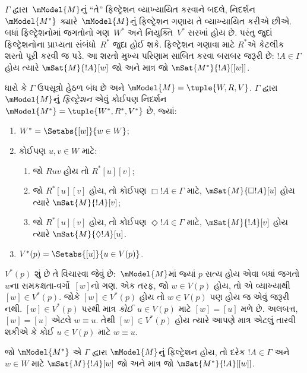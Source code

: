 $\Gamma$ દ્વારા~$\mModel{M}$નું ``તે'' ફિલ્ટ્રેશન વ્યાખ્યાયિત
કરવાને બદલે, નિદર્શન~$\mModel{M^*}$ ક્યારે~$\mModel{M}$નું
ફિલ્ટ્રેશન ગણાય તે વ્યાખ્યાયિત કરીએ છીએ. બધાં ફિલ્ટ્રેશનોમાં
જગતોનો ગણ~$W^*$ અને નિયુક્તિ~$V^*$ સરખાં હોય છે. પરંતુ જુદાં
ફિલ્ટ્રેશનોના પ્રાપ્યતા સંબંધો~$R^*$ જુદા હોઈ શકે. ફિલ્ટ્રેશન
ગણાવા માટે $R^*$એ કેટલીક શરતો પૂરી કરવી જ પડે. આ શરતો મુખ્ય
પરિણામ સાબિત કરવા બરાબર જરૂરી છે: $!A \in \Gamma$ હોય ત્યારે
$\mSat{M}{!A}[w]$ જો અને માત્ર જો
$\mSat{M^*}{!A}[{[w]}]$.

\begin{defn}
  ધારો કે $\Gamma$ ઉપસૂત્રો હેઠળ બંધ છે અને
  $\mModel{M} = \tuple{W, R, V}$. $\Gamma$ દ્વારા
  $\mModel{M}$નું \emph{ફિલ્ટ્રેશન} એવું કોઈપણ નિદર્શન
  $\mModel{M^*} = \tuple{W^*,R^*,V^*}$ છે, જ્યાં:
  \begin{enumerate}
  \item $W^* = \Setabs{[w]}{w \in W}$;
  \item {}%
    કોઈપણ $u,v \in W$ માટે:
    \begin{enumerate}
    \item {}%
      જો $Ruv$ હોય તો $R^*[u][v]$;
    \item {}%
      જો $R^*[u][v]$ હોય, તો કોઈપણ $\Box !A \in \Gamma$ માટે,
      $\mSat{M}{\Box!A}[u]$ હોય ત્યારે $\mSat{M}{!A}[v]$;
    \item {}%
      જો $R^*[u][v]$ હોય, તો કોઈપણ $\Diamond !A \in \Gamma$
      માટે, $\mSat{M}{!A}[v]$ હોય ત્યારે
      $\mSat{M}{\Diamond!A}[u]$.
    \end{enumerate}
  \item $V^*(p) = \Setabs{[u]}{u \in V(p)}$.
  \end{enumerate}
\end{defn}

$V^*(p)$ શું છે તે વિચારવા જેવું છે:~$\mModel{M}$માં જ્યાં $p$
સત્ય હોય એવા બધાં જગતો~$w$ના સમકક્ષતા-વર્ગો~$[w]$નો ગણ.
એક તરફ, જો $w \in V(p)$ હોય, તો એ વ્યાખ્યાથી $[w] \in
V^*(p)$. જોકે $[w] \in V^*(p)$ હોય તો $w \in V(p)$ પણ હોય જ એવું
જરૂરી નથી. $[w] \in V^*(p)$ પરથી માત્ર \emph{કોઈ}~$u \in V(p)$
માટે $[w] = [u]$ મળે છે. અલબત્ત, $[w] = [u]$ એટલે
$w \equiv u$. તેથી $[w] \in V^*(p)$ હોય ત્યારે આપણે
માત્ર એટલું તારવી શકીએ કે કોઈ $u \in V(p)$ માટે $w \equiv u$.

\begin{thm}
  જો $\mModel{M^*}$ એ $\Gamma$ દ્વારા $\mModel{M}$નું ફિલ્ટ્રેશન
  હોય, તો દરેક $!A \in \Gamma$ અને $w \in W$ માટે
  $\mSat{M}{!A}[w]$ જો અને માત્ર જો
  $\mSat{M^*}{!A}[{[w]}]$.
\end{thm}

